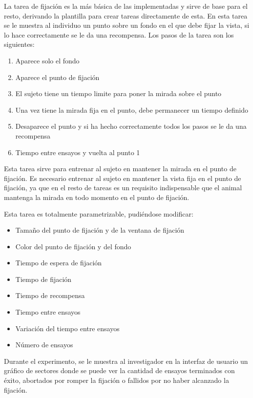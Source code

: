 \documentclass[conference]{IEEEtran}
\begin{document}
La tarea de fijación es la más básica de las implementadas y sirve de base para el resto, derivando la plantilla para crear tareas directamente de esta.
En esta tarea se le muestra al individuo un punto sobre un fondo en el que debe fijar la vista, si lo hace correctamente se le da una recompensa.
Los pasos de la tarea son los siguientes:

\begin{enumerate}
	\item Aparece solo el fondo
	\item Aparece el punto de fijación
	\item El sujeto tiene un tiempo limite para poner la mirada sobre el punto
	\item Una vez tiene la mirada fija en el punto, debe permanecer un tiempo definido
	\item Desaparece el punto y si ha hecho correctamente todos los pasos se le da una recompensa
	\item Tiempo entre ensayos y vuelta al punto 1
\end{enumerate}


Esta tarea sirve para entrenar al sujeto en mantener la mirada en el punto de fijación. Es necesario entrenar al sujeto en mantener la vista fija en el punto de fijación, ya que en el resto de tareas es un requisito indispensable que el animal mantenga la mirada en todo momento en el punto de fijación.

Esta tarea es totalmente parametrizable, pudiéndose modificar:
\begin{itemize}
	\item Tamaño del punto de fijación y de la ventana de fijación
	\item Color del punto de fijación y del fondo
	\item Tiempo de espera de fijación
	\item Tiempo de fijación
	\item Tiempo de recompensa
	\item Tiempo entre ensayos
	\item Variación del tiempo entre ensayos
	\item Número de ensayos
\end{itemize}




Durante el experimento, se le muestra al investigador en la interfaz de usuario un gráfico de sectores donde se puede ver la cantidad de ensayos terminados con éxito, abortados por romper la fijación o fallidos por no haber alcanzado la fijación.
\end{document}
